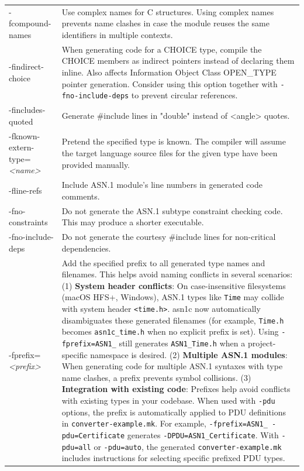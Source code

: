 \documentclass[english,oneside,12pt]{book}
\begin{document}
\begin{longtable}{lp{4in}}
{\ttfamily -fcompound-names} & {\small Use complex names for C structures. Using complex names prevents
name clashes in case the module reuses the same identifiers in multiple
contexts.}\\
{\ttfamily -findirect-choice} & {\small When generating code for a CHOICE type, compile the CHOICE
members as indirect pointers instead of declaring them inline. Also affects Information Object Class OPEN\_TYPE pointer generation. Consider
using this option together with \texttt{-fno-include-deps}
to prevent circular references.}\\
{\ttfamily -fincludes-quoted} & {\small Generate \#include lines in "double" instead of <angle> quotes.}\\
{\ttfamily -fknown-extern-type=\emph{<name>}} & {\small Pretend the specified type is known. The compiler will assume
the target language source files for the given type have been provided
manually. }\\
{\ttfamily -fline-refs} & {\small Include ASN.1 module's line numbers in generated code comments.}\\
{\ttfamily -fno-constraints} & {\small Do not generate the ASN.1 subtype constraint checking code. This
may produce a shorter executable.}\\
{\ttfamily -fno-include-deps} & {\small Do not generate the courtesy \#include lines for non-critical dependencies.}\\
{\ttfamily -fprefix=\emph{<prefix>}} & {\small Add the specified prefix to all generated type names and filenames. This helps avoid naming conflicts in several scenarios: (1) \textbf{System header conflicts}: On case-insensitive filesystems (macOS HFS+, Windows), ASN.1 types like \texttt{Time} may collide with system header \texttt{<time.h>}. asn1c now automatically disambiguates these generated filenames (for example, \texttt{Time.h} becomes \texttt{asn1c\_time.h} when no explicit prefix is set). Using \texttt{-fprefix=ASN1\_} still generates \texttt{ASN1\_Time.h} when a project-specific namespace is desired. (2) \textbf{Multiple ASN.1 modules}: When generating code for multiple ASN.1 syntaxes with type name clashes, a prefix prevents symbol collisions. (3) \textbf{Integration with existing code}: Prefixes help avoid conflicts with existing types in your codebase. When used with \texttt{-pdu} options, the prefix is automatically applied to PDU definitions in \texttt{converter-example.mk}. For example, \texttt{-fprefix=ASN1\_ -pdu=Certificate} generates \texttt{-DPDU=ASN1\_Certificate}. With \texttt{-pdu=all} or \texttt{-pdu=auto}, the generated \texttt{converter-example.mk} includes instructions for selecting specific prefixed PDU types.}\\

\end{longtable}
\end{document}
